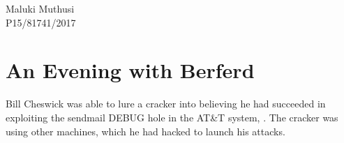 \documentclass{article}
\author{Maluki Muthusi}
\begin{document}
Maluki Muthusi \\
P15/81741/2017

\section*{An Evening with Berferd}

Bill Cheswick was able to lure a cracker into believing he had succeeded in exploiting the sendmail DEBUG hole in the AT\&T system, \citep{Cheswick92anevening}. The cracker was using other machines, which he had hacked to launch his attacks.

\nocite{*}


\end{document}
